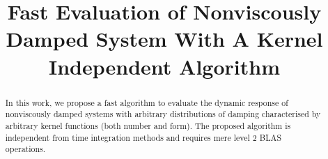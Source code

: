 \documentclass[3p,11pt,fleqn,review]{elsarticle}
\begin{document}
\linenumbers
\begin{abstract}
\begin{linenumbers}
In this work, we propose a fast algorithm to evaluate the dynamic response of nonviscously damped systems with arbitrary distributions of damping characterised by arbitrary kernel functions (both number and form). The proposed algorithm is independent from time integration methods and requires mere level 2 BLAS operations.
\end{linenumbers}
\end{abstract}
\begin{keyword}
\end{keyword}
\begin{frontmatter}
\title{Fast Evaluation of Nonviscously Damped System With A Kernel Independent Algorithm}
\end{frontmatter}


\end{document}
